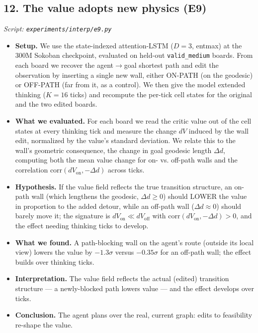 \documentclass[11pt]{article}
\begin{document}
\subsection*{12. The value adopts new physics (E9)}
\textit{Script: \texttt{experiments/interp/e9.py}}
\begin{itemize}
\item \textbf{Setup.} We use the state-indexed attention-LSTM ($D=3$, entmax) at the 300M Sokoban checkpoint, evaluated on held-out \texttt{valid\_medium} boards. From each board we recover the agent$\to$goal shortest path and edit the observation by inserting a single new wall, either ON-PATH (on the geodesic) or OFF-PATH (far from it, as a control). We then give the model extended thinking ($K=16$ ticks) and recompute the per-tick cell states for the original and the two edited boards.
\item \textbf{What we evaluated.} For each board we read the critic value out of the cell states at every thinking tick and measure the change $dV$ induced by the wall edit, normalized by the value's standard deviation. We relate this to the wall's geometric consequence, the change in goal geodesic length $\Delta d$, computing both the mean value change for on- vs. off-path walls and the correlation $\mathrm{corr}(dV_{\text{on}}, -\Delta d)$ across ticks.
\item \textbf{Hypothesis.} If the value field reflects the true transition structure, an on-path wall (which lengthens the geodesic, $\Delta d \geq 0$) should LOWER the value in proportion to the added detour, while an off-path wall ($\Delta d \approx 0$) should barely move it; the signature is $dV_{\text{on}} \ll dV_{\text{off}}$ with $\mathrm{corr}(dV_{\text{on}}, -\Delta d) > 0$, and the effect needing thinking ticks to develop.
\item \textbf{What we found.} A path-blocking wall on the agent's route (outside its local view) lowers the value by $-1.3\sigma$ versus $-0.35\sigma$ for an off-path wall; the effect builds over thinking ticks.
\item \textbf{Interpretation.} The value field reflects the actual (edited) transition structure --- a newly-blocked path lowers value --- and the effect develops over ticks.
\item \textbf{Conclusion.} The agent plans over the real, current graph: edits to feasibility re-shape the value.
\end{itemize}
\clearpage
\end{document}
